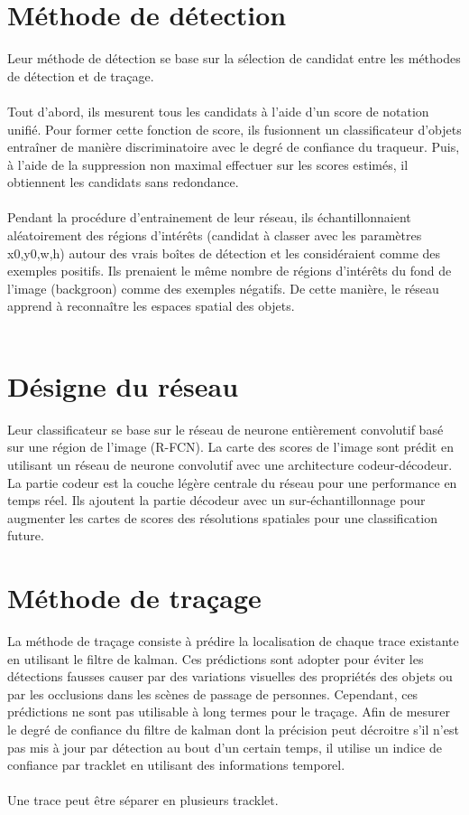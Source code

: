 \documentclass[11pt]{report}
\begin{document}
\section{Méthode de détection}
Leur méthode de détection se base sur la sélection de candidat entre les méthodes de détection et de traçage.\\\\
Tout d'abord, ils mesurent tous les candidats à l'aide d'un score de notation unifié. Pour former cette fonction de score, ils fusionnent un classificateur d'objets entraîner de manière discriminatoire avec le degré de confiance du traqueur. Puis, à l'aide de la suppression non maximal effectuer sur les scores estimés, il obtiennent les candidats sans redondance.\\\\
Pendant la procédure d'entrainement de leur réseau, ils échantillonnaient aléatoirement des régions d'intérêts (candidat à classer avec les paramètres x0,y0,w,h) autour des vrais boîtes de détection et les considéraient comme des exemples positifs. Ils prenaient le même nombre de régions d'intérêts du fond de l'image (backgroon) comme des exemples négatifs. De cette manière, le réseau apprend à reconnaître les espaces spatial des objets.\\\\


\section{Désigne du réseau}
Leur classificateur se base sur le réseau de neurone entièrement convolutif basé sur une région de l'image (R-FCN). La carte des scores de l'image sont prédit en utilisant un réseau de neurone convolutif avec une architecture codeur-décodeur. La partie codeur est la couche légère centrale du réseau pour une performance en temps réel. Ils ajoutent la partie décodeur avec un sur-échantillonnage pour augmenter les cartes de scores des résolutions spatiales pour une classification future.

\section{Méthode de traçage}
La méthode de traçage consiste à prédire la localisation de chaque trace existante en utilisant le filtre de kalman. 
Ces prédictions sont adopter pour éviter les détections fausses causer par des variations visuelles des propriétés des objets ou par les occlusions dans les scènes de passage de personnes. Cependant, ces prédictions ne sont pas utilisable à long termes pour le traçage. Afin de mesurer le degré de confiance du filtre de kalman dont la précision peut décroitre s'il n'est pas mis à jour par détection au bout d'un certain temps, il utilise un indice de confiance par tracklet en utilisant des informations temporel.\\\\
Une trace peut être séparer en plusieurs tracklet.
\end{document}
